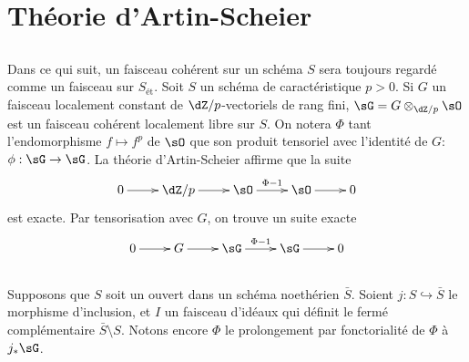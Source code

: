 \section{Théorie d'Artin-Scheier}\label{III:3}





\subsection{}\label{III:3-1}

Dans ce qui suit, un faisceau cohérent sur un schéma $S$ sera toujours 
regardé comme un faisceau sur $S_\text{ét}$. Soit $S$ un schéma de 
caractéristique $p>0$. Si $G$ un faisceau localement constant de 
$\dZ/p$-vectoriels de rang fini, $\sG=G\otimes_{\dZ/p}\sO$ est un faisceau 
cohérent localement libre sur $S$. On notera $\Phi$ tant l'endomorphisme 
$f\mapsto f^p$ de $\sO$ que son produit tensoriel avec l'identité de 
$G$: $\phi:\sG\to\sG$. La théorie d'Artin-Scheier \cite[IX 3.5]{sga4} 
affirme que la suite 
\[\xymatrix{
  0 \ar[r] 
    & \dZ/p \ar[r] 
    & \sO \ar[r]^-{\Phi-1} 
    & \sO \ar[r] 
    & 0
}\]
est exacte. Par tensorisation avec $G$, on trouve un suite exacte 
\[\xymatrix{
  0 \ar[r] 
    & G \ar[r] 
    & \sG \ar[r]^-{\Phi-1} 
    & \sG \ar[r] 
    & 0
}\]





\subsection{}\label{III:3-2}

Supposons que $S$ soit un ouvert dans un schéma noethérien $\bar S$. 
Soient $j:S\hookrightarrow \bar S$ le morphisme d'inclusion, et $I$ un 
faisceau d'idéaux qui définit le fermé complémentaire 
$\bar S\setminus S$. Notons encore $\Phi$ le prolongement par fonctorialité 
de $\Phi$ à $j_*\sG$. 





